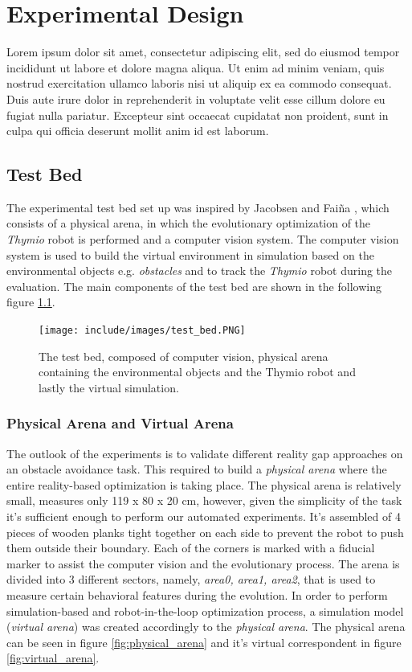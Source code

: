 \chapter{Experimental Design}

Lorem ipsum dolor sit amet, consectetur adipiscing elit, sed do eiusmod tempor incididunt ut labore et dolore magna aliqua. Ut enim ad minim veniam, quis nostrud exercitation ullamco laboris nisi ut aliquip ex ea commodo consequat. Duis aute irure dolor in reprehenderit in voluptate velit esse cillum dolore eu fugiat nulla pariatur. Excepteur sint occaecat cupidatat non proident, sunt in culpa qui officia deserunt mollit anim id est laborum.

\section{Test Bed}
The experimental test bed set up was inspired by Jacobsen and Faiña \cite{faina2017automating}, which consists of a physical arena, in which the evolutionary optimization of the \emph{Thymio} robot is performed and a computer vision system. The computer vision system is used to build the virtual environment in simulation based on the environmental objects e.g. \emph{obstacles} and to track the \emph{Thymio} robot during the evaluation. The main components of the test bed are shown in the following figure \ref{fig:test_bed}.

\begin{figure}[H]
  \centering
  \texttt{[image: include/images/test\_bed.PNG]}
  \caption{The test bed, composed of computer vision, physical arena containing the environmental objects and the Thymio robot and lastly the virtual simulation.}
  \label{fig:test_bed}
\end{figure}

\subsection{Physical Arena and Virtual Arena}

The outlook of the experiments is to validate different reality gap approaches on an obstacle avoidance task. This required to build a \emph{physical arena} where the entire reality-based optimization is taking place. The physical arena is relatively small, measures only 119 x 80 x 20 cm, however, given the simplicity of the task it's sufficient enough to perform our automated experiments. It's assembled of 4 pieces of wooden planks tight together on each side to prevent the robot to push them outside their boundary. Each of the corners is marked with a fiducial marker to assist the computer vision and the evolutionary process. The arena is divided into 3 different sectors, namely, \emph{area0, area1, area2}, that is used to measure certain behavioral features during the evolution. In order to perform simulation-based and robot-in-the-loop optimization process, a simulation model (\emph{virtual arena}) was created accordingly to the \emph{physical arena}. The physical arena can be seen in figure \ref{fig:physical_arena} and it's virtual correspondent in figure \ref{fig:virtual_arena}.


